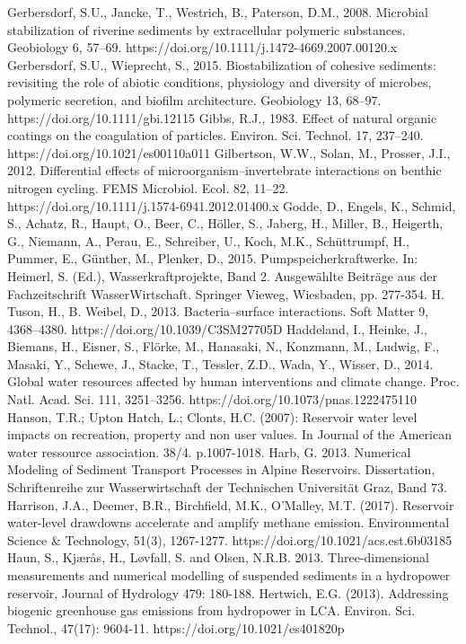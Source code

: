 \begin{thebibliography}{}
Gerbersdorf, S.U., Jancke, T., Westrich, B., Paterson, D.M., 2008. Microbial stabilization of riverine sediments by extracellular polymeric substances. Geobiology 6, 57–69. https://doi.org/10.1111/j.1472-4669.2007.00120.x
Gerbersdorf, S.U., Wieprecht, S., 2015. Biostabilization of cohesive sediments: revisiting the role of abiotic conditions, physiology and diversity of microbes, polymeric secretion, and biofilm architecture. Geobiology 13, 68–97. https://doi.org/10.1111/gbi.12115
Gibbs, R.J., 1983. Effect of natural organic coatings on the coagulation of particles. Environ. Sci. Technol. 17, 237–240. https://doi.org/10.1021/es00110a011
Gilbertson, W.W., Solan, M., Prosser, J.I., 2012. Differential effects of microorganism–invertebrate interactions on benthic nitrogen cycling. FEMS Microbiol. Ecol. 82, 11–22. https://doi.org/10.1111/j.1574-6941.2012.01400.x
Godde, D., Engels, K., Schmid, S., Achatz, R., Haupt, O., Beer, C., Höller, S., Jaberg, H., Miller, B., Heigerth, G., Niemann, A., Perau, E., Schreiber, U., Koch, M.K., Schüttrumpf, H., Pummer, E., Günther, M., Plenker, D., 2015. Pumpspeicherkraftwerke. In: Heimerl, S. (Ed.), Wasserkraftprojekte, Band 2. Ausgewählte Beiträge aus der Fachzeitschrift WasserWirtschaft. Springer Vieweg, Wiesbaden, pp. 277-354.
H. Tuson, H., B. Weibel, D., 2013. Bacteria–surface interactions. Soft Matter 9, 4368–4380. https://doi.org/10.1039/C3SM27705D
Haddeland, I., Heinke, J., Biemans, H., Eisner, S., Flörke, M., Hanasaki, N., Konzmann, M., Ludwig, F., Masaki, Y., Schewe, J., Stacke, T., Tessler, Z.D., Wada, Y., Wisser, D., 2014. Global water resources affected by human interventions and climate change. Proc. Natl. Acad. Sci. 111, 3251–3256. https://doi.org/10.1073/pnas.1222475110
Hanson, T.R.; Upton Hatch, L.; Clonts, H.C. (2007): Reservoir water level impacts on recreation, property and non user values. In Journal of the American water ressource association. 38/4. p.1007-1018.
Harb, G. 2013. Numerical Modeling of Sediment Transport Processes in Alpine Reservoirs. Dissertation, Schriftenreihe zur Wasserwirtschaft der Technischen Universität Graz, Band 73.
Harrison, J.A., Deemer, B.R., Birchfield, M.K., O'Malley, M.T. (2017). Reservoir water-level drawdowns accelerate and amplify methane emission. Environmental Science & Technology, 51(3), 1267-1277. https://doi.org/10.1021/acs.est.6b03185
Haun, S., Kjærås, H., Løvfall, S. and Olsen, N.R.B. 2013. Three-dimensional measurements and numerical modelling of suspended sediments in a hydropower reservoir, Journal of Hydrology 479: 180-188.
Hertwich, E.G. (2013). Addressing biogenic greenhouse gas emissions from hydropower in LCA. Environ. Sci. Technol., 47(17): 9604-11. https://doi.org/10.1021/es401820p

\end{thebibliography}
